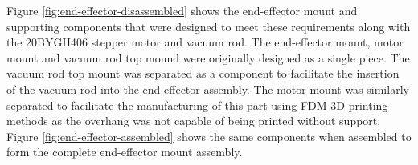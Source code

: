 Figure \ref{fig:end-effector-disassembled} shows the end-effector mount and supporting components that were designed to meet these requirements along with the 20BYGH406 stepper motor and vacuum rod. The end-effector mount, motor mount and vacuum rod top mound were originally designed as a single piece. The vacuum rod top mount was separated as a component to facilitate the insertion of the vacuum rod into the end-effector assembly. The motor mount was similarly separated to facilitate the manufacturing of this part using FDM 3D printing methods as the overhang was not capable of being printed without support. Figure \ref{fig:end-effector-assembled} shows the same components when assembled to form the complete end-effector mount assembly.

%

